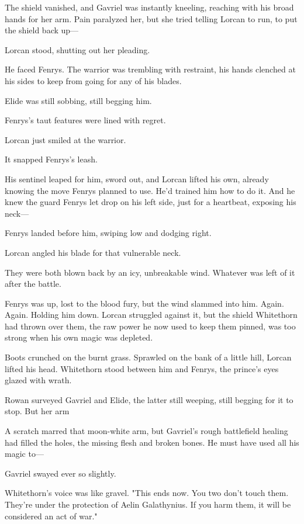 The shield vanished, and Gavriel was instantly kneeling, reaching with his broad hands for her arm.
Pain paralyzed her, but she tried telling Lorcan to run, to put the shield back up---

Lorcan stood, shutting out her pleading.

He faced Fenrys.
The warrior was trembling with restraint, his hands clenched at his sides to keep from going for any of his blades.

Elide was still sobbing, still begging him.

Fenrys's taut features were lined with regret.

Lorcan just smiled at the warrior.

It snapped Fenrys's leash.

His sentinel leaped for him, sword out, and Lorcan lifted his own, already knowing the move Fenrys planned to use.
He'd trained him how to do it.
And he knew the guard Fenrys let drop on his left side, just for a heartbeat, exposing his neck---

Fenrys landed before him, swiping low and dodging right.

Lorcan angled his blade for that vulnerable neck.

They were both blown back by an icy, unbreakable wind.
Whatever was left of it after the battle.

Fenrys was up, lost to the blood fury, but the wind slammed into him.
Again.
Again.
Holding him down.
Lorcan struggled against it, but the shield Whitethorn had thrown over them, the raw power he now used to keep them pinned, was too strong when his own magic was depleted.

Boots crunched on the burnt grass.
Sprawled on the bank of a little hill, Lorcan lifted his head.
Whitethorn stood between him and Fenrys, the prince's eyes glazed with wrath.

Rowan surveyed Gavriel and Elide, the latter still weeping, still begging for it to stop.
But her arm 

A scratch marred that moon-white arm, but Gavriel's rough battlefield healing had filled the holes, the missing flesh and broken bones.
He must have used all his magic to---

Gavriel swayed ever so slightly.

Whitethorn's voice was like gravel.
"This ends now.
You two don't touch them.
They're under the protection of Aelin Galathynius.
If you harm them, it will be considered an act of war."


